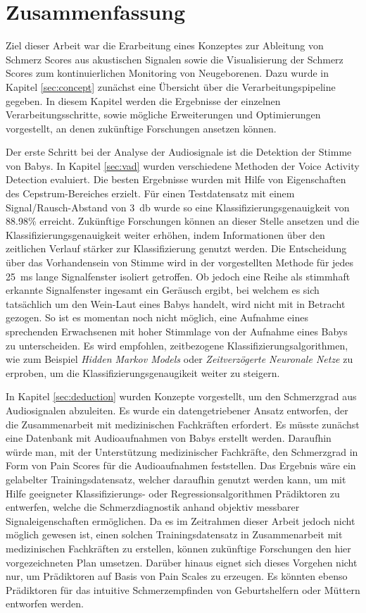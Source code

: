 \chapter{Zusammenfassung}

Ziel dieser Arbeit war die Erarbeitung eines Konzeptes zur Ableitung von Schmerz Scores aus akustischen Signalen sowie die Visualisierung der Schmerz Scores zum kontinuierlichen Monitoring von Neugeborenen. Dazu wurde in Kapitel \ref{sec:concept} zunächst eine Übersicht über die Verarbeitungspipeline gegeben. In diesem Kapitel werden die Ergebnisse der einzelnen Verarbeitungsschritte, sowie mögliche Erweiterungen und Optimierungen vorgestellt, an denen zukünftige Forschungen ansetzen können.

Der erste Schritt bei der Analyse der Audiosignale ist die Detektion der Stimme von Babys. In Kapitel \ref{sec:vad} wurden verschiedene Methoden der Voice Activity Detection evaluiert. Die besten Ergebnisse wurden mit Hilfe von Eigenschaften des \glqq Cepstrum\grqq -Bereiches erzielt. Für einen Testdatensatz mit einem Signal/Rausch-Abstand von \SI{3}{\decibel} wurde so eine Klassifizierungsgenauigkeit von 88.98\% erreicht. Zukünftige Forschungen können an dieser Stelle ansetzen und die Klassifizierungsgenauigkeit weiter erhöhen, indem Informationen über den zeitlichen Verlauf stärker zur Klassifizierung genutzt werden. Die Entscheidung über das Vorhandensein von Stimme wird in der vorgestellten Methode für jedes \SI{25}{\milli\second} lange Signalfenster isoliert getroffen. Ob jedoch eine Reihe als stimmhaft erkannte Signalfenster ingesamt ein Geräusch ergibt, bei welchem es sich tatsächlich um den Wein-Laut eines Babys handelt, wird nicht mit in Betracht gezogen. So ist es momentan noch nicht möglich, eine Aufnahme eines sprechenden Erwachsenen mit hoher Stimmlage von der Aufnahme eines Babys zu unterscheiden. Es wird empfohlen, zeitbezogene Klassifizierungsalgorithmen, wie zum Beispiel \emph{Hidden Markov Models} oder \emph{Zeitverzögerte Neuronale Netze} zu erproben, um die Klassifizierungsgenaugikeit weiter zu steigern.

In Kapitel \ref{sec:deduction} wurden Konzepte vorgestellt, um den Schmerzgrad aus Audiosignalen abzuleiten. Es wurde ein datengetriebener Ansatz entworfen, der die Zusammenarbeit mit medizinischen Fachkräften erfordert. Es müsste zunächst eine Datenbank mit Audioaufnahmen von Babys erstellt werden. Daraufhin würde man, mit der Unterstützung medizinischer Fachkräfte, den Schmerzgrad in Form von Pain Scores für die Audioaufnahmen feststellen. Das Ergebnis wäre ein gelabelter Trainingsdatensatz, welcher daraufhin genutzt werden kann, um mit Hilfe geeigneter Klassifizierungs- oder Regressionsalgorithmen Prädiktoren zu entwerfen, welche die Schmerzdiagnostik anhand objektiv messbarer Signaleigenschaften ermöglichen. Da es im Zeitrahmen dieser Arbeit jedoch nicht möglich gewesen ist, einen solchen Trainingsdatensatz in Zusammenarbeit mit medizinischen Fachkräften zu erstellen, können zukünftige Forschungen den hier vorgezeichneten Plan umsetzen. Darüber hinaus eignet sich dieses Vorgehen nicht nur, um Prädiktoren auf Basis von Pain Scales zu erzeugen. Es könnten ebenso Prädiktoren für das intuitive Schmerzempfinden von Geburtshelfern oder Müttern entworfen werden.

